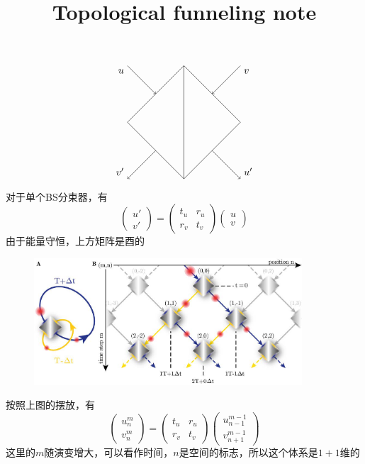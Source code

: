 \documentclass[hyperref,UTF8]{ctexart}
\title{Topological funneling note}
\date{}
\begin{document}
\maketitle
\[
    \begin{tikzpicture}
        \coordinate(A) at (-2,0) {};
        \coordinate(B) at (0,2) {};
        \coordinate(C) at (2,0) {};
        \coordinate(D) at (0,-2) {};
        \coordinate(U) at (-2,2) {};
        \coordinate(V) at (2,2) {};
        \node[below left] (O) at (-2,2) {$u$};
        \node[below right] (O) at (2,2) {$v$};
        \draw (A)--(B);
        \draw (C)--(B);
        \draw (C)--(D);
        \draw (A)--(D);
        \draw (B)--(D);
        \draw[->] (U)--(-1,1);
        \draw[->] (V)--(1,1);
        \draw[->] (-1,-1)--(-2,-2);
        \draw[->] (1,-1)--(2,-2);
        \node[above left] (O) at (-2,-2) {$v'$};
        \node[above right] (O) at (2,-2) {$u'$};
    \end{tikzpicture}
\]
对于单个BS分束器，有
\[\begin{pmatrix}
    u'\\v'
\end{pmatrix}=\begin{pmatrix}
    t_u&r_u\\
    r_v&t_v
\end{pmatrix}\begin{pmatrix}
    u\\v
\end{pmatrix}\]
由于能量守恒，上方矩阵是酉的
\begin{figure}[H]
    \centering
    \includegraphics[width = 10cm]{第4页-1.PNG}
\end{figure}
按照上图的摆放，有
\[\begin{pmatrix}
    u_n^m\\v_n^m
\end{pmatrix}=\begin{pmatrix}
    t_u&r_u\\
    r_v&t_v
\end{pmatrix}\begin{pmatrix}
    u_{n-1}^{m-1}\\v_{n+1}^{m-1}
\end{pmatrix}\]
这里的\(m\)随演变增大，可以看作时间，\(n\)是空间的标志，所以这个体系是\(1+1\)维的
\end{document}
